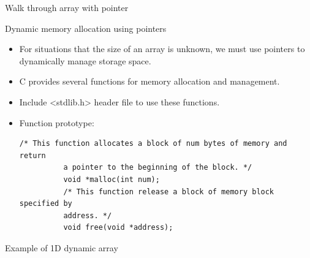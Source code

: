 \documentclass[10pt,t]{beamer}
\begin{document}
\begin{frame}[fragile]{Walk through array with pointer}
  
\end{frame}

\begin{frame}[fragile]{Dynamic memory allocation using pointers}
  \begin{itemize}
  \item For situations that the size of an array is unknown, we must use
    pointers to dynamically manage storage space.
    \item C provides several functions for memory allocation and
    management.
    \item Include <stdlib.h> header file to use these functions.
    \item Function prototype:
      \begin{lstlisting}[basicstyle=\scriptsize\ttfamily]
          /* This function allocates a block of num bytes of memory and return
          a pointer to the beginning of the block. */
          void *malloc(int num);
          /* This function release a block of memory block specified by
          address. */
          void free(void *address);
      \end{lstlisting}
  \end{itemize}
\end{frame}

\begin{frame}[fragile]{Example of 1D dynamic array}
  
\end{frame}
\end{document}
